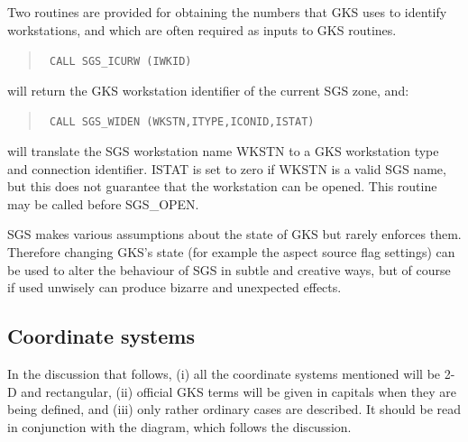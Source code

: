 \documentclass[11pt]{article}
\newcommand{\htmlref}[2]{#1}
\begin{document}
Two routines are provided for obtaining the numbers that GKS uses to identify
workstations, and which are often required as inputs to GKS routines.
\begin{quote}{\tt
    CALL \htmlref{SGS\_ICURW}{SGS_ICURW} (IWKID)}
\end{quote}
will return the GKS workstation identifier of the current SGS zone, and:
\begin{quote}{\tt
    CALL \htmlref{SGS\_WIDEN}{SGS_WIDEN} (WKSTN,ITYPE,ICONID,ISTAT)}
\end{quote}
will translate the SGS workstation name WKSTN to a GKS workstation type and
connection identifier.
ISTAT is set to zero if WKSTN is a valid SGS name, but this does not guarantee
that the workstation can be opened.
This routine may be called before SGS\_OPEN.

SGS makes various assumptions about the state of GKS but rarely enforces them.
Therefore changing GKS's state (for example the aspect source flag settings)
can be used to alter the behaviour of SGS in subtle and creative ways, but of
course if used unwisely can produce bizarre and unexpected effects.

\subsection* {Coordinate systems}\label{app-coordinates}

In the discussion that follows, (i) all the coordinate systems
mentioned will be 2-D and rectangular, (ii) official
GKS terms will be given in capitals when they are being
defined, and (iii) only rather ordinary cases are described.  It
should be read in conjunction with the diagram, which follows the
discussion.
\end{document}

